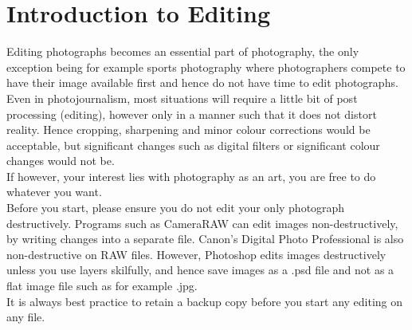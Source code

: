 \section{Introduction to Editing}

Editing photographs becomes an essential part of photography, the only exception being for example sports photography where photographers compete to have their image available first and hence do not have time to edit photographs.
\\
Even in photojournalism, most situations will require a little bit of post processing (editing), however only in a manner such that it does not distort reality. Hence cropping, sharpening and minor colour corrections would be acceptable, but significant changes such as digital filters or significant colour changes would not be.
\\
If however, your interest lies with photography as an art, you are free to do whatever you want.
\\[\baselineskip]
Before you start, please ensure you do not edit your only photograph destructively. Programs such as CameraRAW can edit images non-destructively, by writing changes into a separate file. Canon's Digital Photo Professional is also non-destructive on \gls{RAW} files. However, Photoshop edits images destructively unless you use layers skilfully, and hence save images as a .psd file and not as a flat image file such as for example .jpg.
\\
It is always best practice to retain a backup copy before you start any editing on any file.